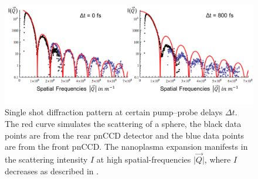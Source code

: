 \begin{figure}
	\centering
		\includegraphics[width=1.0\textwidth]{images/results/Xe-diff-pattern.png}
	\caption[Single-shot diffraction pattern of Xe-cluster at varying time delays]{Single shot diffraction pattern at certain pump--probe delays $\Delta t$. The red curve simulates the scattering of a sphere, the black data points are from the rear pnCCD detector and the blue data points are from the front pnCCD. The nanoplasma expansion manifests in the scattering intensity $I$ at high spatial-frequencies $\lvert \vec{Q}\rvert$, where $I$ decreases as described in \citep{Gorkhover-2016-NatPho}.}
	\label{fig:Xe-only-diff-pattern}
\end{figure}
